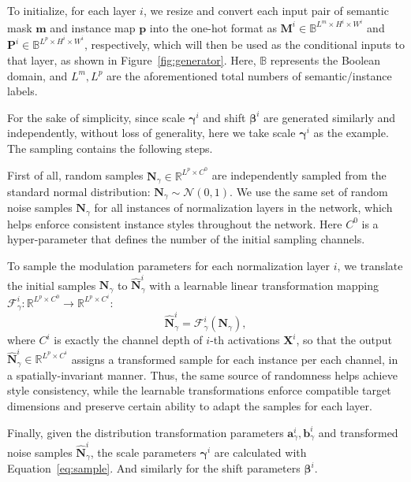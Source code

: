 \documentclass[final]{cvpr}
\begin{document}
To initialize, for each layer $i$, we resize and convert each input pair of semantic mask $\bm{m}$ and instance map $\bm{p}$ into the one-hot format as $\bm{M}^i\in\mathbb{B}^{L^m\times H^i\times W^i}$ and $\bm{P}^i\in\mathbb{B}^{L^p\times H^i\times W^i}$, respectively, which will then be used as the conditional inputs to that layer, as shown in Figure~\ref{fig:generator}. Here, $\mathbb{B}$ represents the Boolean domain, and $L^m,L^p$ are the aforementioned total numbers of semantic/instance labels.

For the sake of simplicity, since scale $\bm{\gamma}^i$ and shift $\bm{\beta}^i$ are generated similarly and independently, without loss of generality, here we take scale $\bm{\gamma}^i$ as the example. The sampling contains the following steps.

First of all, random samples $\bm{N}_\gamma\in\mathbb{R}^{L^p\times C^0}$ are independently sampled from the standard normal distribution: $\bm{N}_\gamma\sim\mathcal{N}(0,1)$. We use the same set of random noise samples $\bm{N}_\gamma$ for all instances of normalization layers in the network, which helps enforce consistent instance styles throughout the network. Here $C^0$ is a hyper-parameter that defines the number of the initial sampling channels.

To sample the modulation parameters for each normalization layer $i$, we translate the initial samples $\bm{N}_\gamma$ to $\hat{\bm{N}}^i_\gamma$ with a learnable linear transformation mapping $\mathcal{F}^i_\gamma:\mathbb{R}^{L^p\times C^0}\to\mathbb{R}^{L^p\times C^i}$:
\begin{equation}
    \hat{\bm{N}}^i_\gamma = \mathcal{F}^i_\gamma(\bm{N}_\gamma),
\end{equation}
where $C^i$ is exactly the channel depth of $i$-th activations $\bm{X}^i$, so that the output $\hat{\bm{N}}^i_\gamma\in\mathbb{R}^{L^p\times C^i}$ assigns a transformed sample for each instance per each channel, in a spatially-invariant manner. Thus, the same source of randomness helps achieve style consistency, while the learnable transformations enforce compatible target dimensions and preserve certain ability to adapt the samples for each layer.

Finally, given the distribution transformation parameters $\bm{a}^i_{\gamma},\bm{b}^i_{\gamma}$ and transformed noise samples $\hat{\bm{N}}^i_\gamma$, the scale parameters $\bm{\gamma}^i$ are calculated with Equation~\ref{eq:sample}. And similarly for the shift parameters $\bm{\beta}^i$.
\end{document}
